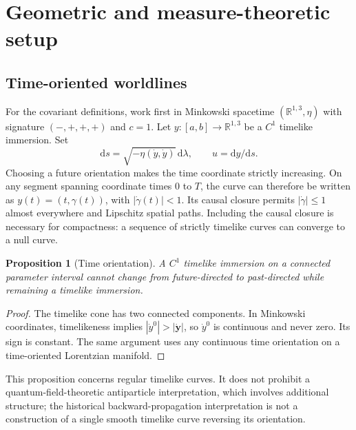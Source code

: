 \documentclass[aip,jmp,reprint,onecolumn,amsmath,amssymb]{revtex4-2}
\newcommand{\dd}{\mathrm{d}}
\newcommand{\R}{\mathbb R}
\newtheorem{proposition}[theorem]{Proposition}
\theoremstyle{definition}
\begin{document}
\section{Geometric and measure-theoretic setup}
\subsection{Time-oriented worldlines}
For the covariant definitions, work first in Minkowski spacetime $(\R^{1,3},\eta)$ with signature $(-,+,+,+)$ and $c=1$. Let $y:[a,b]\to\R^{1,3}$ be a $C^1$ timelike immersion. Set
\begin{equation}
 \dd s=\sqrt{-\eta(\dot y,\dot y)}\,\dd\lambda,
 \qquad u=\dd y/\dd s .
 \label{eq:proper}
\end{equation}
Choosing a future orientation makes the time coordinate strictly increasing. On any segment spanning coordinate times $0$ to $T$, the curve can therefore be written as $y(t)=(t,\gamma(t))$, with $|\dot\gamma(t)|<1$. Its causal closure permits $|\dot\gamma|\le1$ almost everywhere and Lipschitz spatial paths. Including the causal closure is necessary for compactness: a sequence of strictly timelike curves can converge to a null curve.

\begin{proposition}[Time orientation]
A $C^1$ timelike immersion on a connected parameter interval cannot change from future-directed to past-directed while remaining a timelike immersion.
\end{proposition}
\begin{proof}
The timelike cone has two connected components. In Minkowski coordinates, timelikeness implies $|\dot y^0|>|\dot{\mathbf y}|$, so $\dot y^0$ is continuous and never zero. Its sign is constant. The same argument uses any continuous time orientation on a time-oriented Lorentzian manifold.
\end{proof}
This proposition concerns regular timelike curves. It does not prohibit a quantum-field-theoretic antiparticle interpretation, which involves additional structure; the historical backward-propagation interpretation is not a construction of a single smooth timelike curve reversing its orientation.\cite{feynman}
\end{document}
